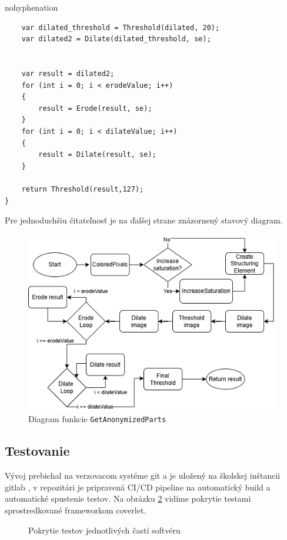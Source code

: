 \begin{hyphenrules}{nohyphenation}
\begin{lstlisting}
    var dilated_threshold = Threshold(dilated, 20);
    var dilated2 = Dilate(dilated_threshold, se);


    var result = dilated2;
    for (int i = 0; i < erodeValue; i++)
    {
        result = Erode(result, se);
    }
    for (int i = 0; i < dilateValue; i++)
    {
        result = Dilate(result, se);
    }

    return Threshold(result,127);
}
\end{lstlisting}

Pre jednoduchšiu čitateľnosť je na ďalšej strane znázornený stavový diagram.
\newpage
\begin{figure}[H]
    \centering
    \includegraphics[width=0.9\linewidth]{img/diagram.png}
    \caption{Diagram funkcie \texttt{GetAnonymizedParts}}
    \label{fig:6.3}
\end{figure}
\subsection{Testovanie}
Vývoj prebiehal na verzovacom systéme git a je uložený na školskej inštancii gitlab \cite{lukassalak}, v repozitári je pripravená CI/CD pipeline na automatický build a automatické spustenie testov. Na obrázku \ref{fig:6.4} vidíme pokrytie testami sprostredkované frameworkom coverlet\cite{coverlet}.

\begin{figure}[H]
    \centering
    \caption{Pokrytie testov jednotlivých častí softvéru\cite{coverlet}}
    \label{fig:6.4}
\end{figure}
\end{hyphenrules}